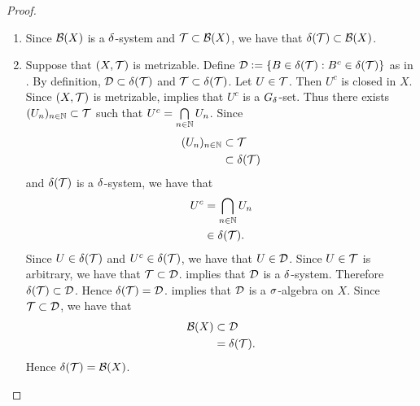 \documentclass{book}
\begin{document}
	\begin{proof}\
		\begin{enumerate}
			\item Since $\mathcal{B}(X)$ is a $\delta$-system and $\mathcal{T} \subset \mathcal{B}(X)$, we have that $\delta(\mathcal{T}) \subset \mathcal{B}(X)$. 
			\item Suppose that $(X, \mathcal{T})$ is metrizable. Define $\mathcal{D} \vcentcolon= \{B \in \delta(\mathcal{T}): B^c \in \delta(\mathcal{T})\}$ as in . By definition, $\mathcal{D} \subset \delta(\mathcal{T})$ and $\mathcal{T} \subset \delta(\mathcal{T})$. Let $U \in \mathcal{T}$. Then $U^c$ is closed in $X$. Since $(X, \mathcal{T})$ is metrizable,  implies that $U^c$ is a $G_{\delta}$-set. Thus there exists $(U_n)_{n \in \mathbb{N}} \subset \mathcal{T}$ such that $U^c = \bigcap\limits_{n \in \mathbb{N}} U_n$. Since 
			\begin{align*}
				(U_n)_{n \in \mathbb{N}} 
				& \subset \mathcal{T} \\
				& \subset \delta(\mathcal{T})
			\end{align*} 
			and $\delta(\mathcal{T})$ is a $\delta$-system, we have that 
			\begin{align*}
				U^c
				& = \bigcap\limits_{n \in \mathbb{N}} U_n \\
				& \in \delta(\mathcal{T}).
			\end{align*}
			Since $U \in \delta(\mathcal{T})$ and $U^c \in \delta(\mathcal{T})$, we have that $U \in \mathcal{D}$. Since $U \in \mathcal{T}$ is arbitrary, we have that $\mathcal{T} \subset \mathcal{D}$.  implies that $\mathcal{D}$ is a $\delta$-system. Therefore $\delta(\mathcal{T}) \subset \mathcal{D}$. Hence $\delta(\mathcal{T}) = \mathcal{D}$.  implies that $\mathcal{D}$ is a $\sigma$-algebra on $X$. Since $\mathcal{T} \subset \mathcal{D}$, we have that  
			\begin{align*}
				\mathcal{B}(X)
				& \subset \mathcal{D} \\
				& = \delta(\mathcal{T}).
			\end{align*}
			Hence $\delta(\mathcal{T}) = \mathcal{B}(X)$. 
		\end{enumerate}
	\end{proof}
\end{document}

